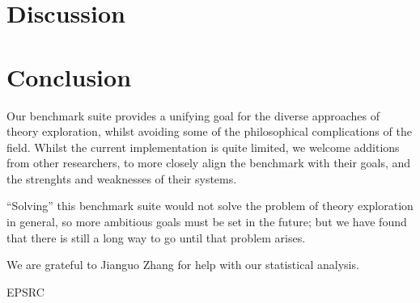 \section{Discussion}
\label{sec:discussion}


\section{Conclusion}
\label{sec:conclusion}


Our benchmark suite provides a unifying goal for the diverse approaches of
theory exploration, whilst avoiding some of the philosophical complications of
the field. Whilst the current implementation is quite limited, we welcome
additions from other researchers, to more closely align the benchmark with their
goals, and the strenghts and weaknesses of their systems.

``Solving'' this benchmark suite would not solve the problem of theory
exploration in general, so more ambitious goals must be set in the future; but
we have found that there is still a long way to go until that problem arises.

\begin{acknowledgements}
  We are grateful to Jianguo Zhang for help with our statistical analysis.

  EPSRC
\end{acknowledgements}





